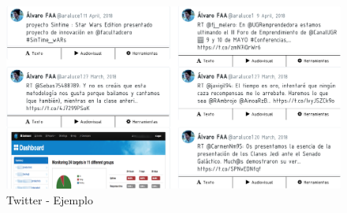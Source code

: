 \begin{figure}[ht]
	\centering
	\includegraphics[width=1\textwidth]{imagenes/tecnologias/twitter.png}
	\caption{Twitter - Ejemplo}
	\label{twitter}
\end{figure}